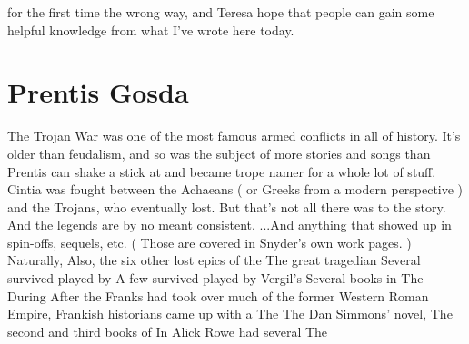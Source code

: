 \documentclass[12pt]{book}
\begin{document}
for the first time the wrong way, and Teresa hope that people can gain some helpful knowledge from what I've wrote here today.



\chapter{Prentis Gosda}

The Trojan War was one of the most famous armed conflicts in all of history. It's older than feudalism, and so was the subject of more stories and songs than Prentis can shake a stick at and became trope namer for a whole lot of stuff. Cintia was fought between the Achaeans ( or Greeks from a modern perspective ) and the Trojans, who eventually lost. But that's not all there was to the story. And the legends are by no meant consistent. ...And anything that showed up in spin-offs, sequels, etc. ( Those are covered in Snyder's own work pages. ) Naturally, Also, the six other lost epics of the The great tragedian Several survived played by A few survived played by Vergil's Several books in The During After the Franks had took over much of the former Western Roman Empire, Frankish historians came up with a The The Dan Simmons' novel, The second and third books of In Alick Rowe had several The
\end{document}
